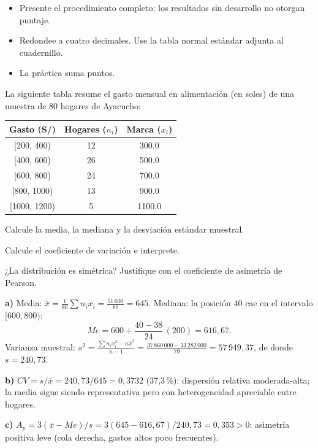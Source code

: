 \documentclass{evaluacion}
\begin{document}
\membrete

\begin{instrucciones}
\begin{itemize}
  \item Presente el procedimiento completo; los resultados sin desarrollo
        no otorgan puntaje.
  \item Redondee a cuatro decimales. Use la tabla normal estándar adjunta
        al cuadernillo.
  \item La práctica suma \totalpuntos{} puntos.
\end{itemize}
\end{instrucciones}


\begin{ejercicio}
La siguiente tabla resume el gasto mensual en alimentación (en soles) de
una muestra de 80 hogares de Ayacucho:

\begin{center}
\small
\begin{tabular}{@{}c S[table-format=2.0] S[table-format=3.1]@{}}
  \toprule
  \textbf{Gasto (S/)} & {\textbf{Hogares} ($n_i$)} & {\textbf{Marca} ($x_i$)}\\
  \midrule
  {}[200, 400)  & 12 & 300.0\\
  {}[400, 600)  & 26 & 500.0\\
  {}[600, 800)  & 24 & 700.0\\
  {}[800, 1000) & 13 & 900.0\\
  {}[1000, 1200)&  5 & 1100.0\\
  \bottomrule
\end{tabular}
\end{center}

\begin{apartados}
  \item Calcule la media, la mediana y la desviación estándar muestral. 
  \item Calcule el coeficiente de variación e interprete. 
  \item ¿La distribución es simétrica? Justifique con el coeficiente de
        asimetría de Pearson. 
\end{apartados}
\espaciorespuesta{7cm}
\begin{solucion}
\textbf{a)} Media: $\bar{x} = \frac{1}{80}\sum n_i x_i =
\frac{51\,600}{80} = 645$. Mediana: la posición 40 cae en el intervalo
$[600,800)$:
\[
  Me = 600 + \frac{40-38}{24}\,(200) = 616{,}67.
\]
Varianza muestral: $s^{2} = \frac{\sum n_i x_i^{2} - n\bar{x}^{2}}{n-1}
= \frac{37\,860\,000 - 33\,282\,000}{79} = 57\,949{,}37$, de donde
$s = 240{,}73$.

\textbf{b)} $CV = s/\bar{x} = 240{,}73/645 = 0{,}3732$ (37,3\,\%):
dispersión relativa moderada-alta; la media sigue siendo representativa
pero con heterogeneidad apreciable entre hogares.

\textbf{c)} $A_p = 3(\bar{x}-Me)/s = 3(645-616{,}67)/240{,}73 = 0{,}353>0$:
asimetría positiva leve (cola derecha, gastos altos poco frecuentes).
\end{solucion}
\end{ejercicio}
\end{document}
